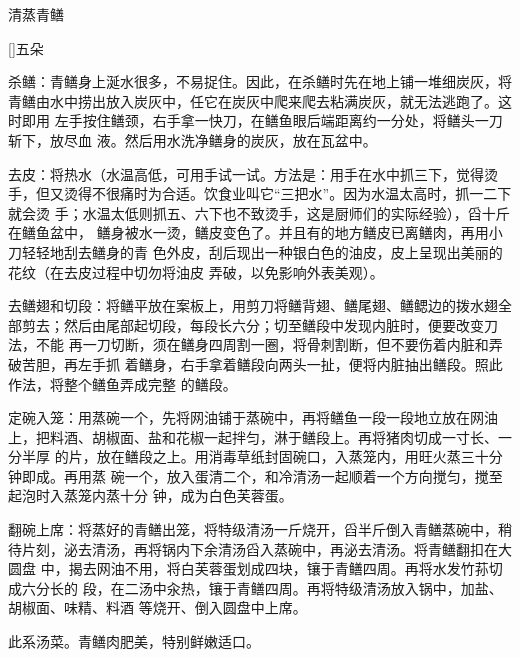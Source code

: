 \begin{recipe}{清蒸青鳝}

\ingredients

[\footnotemark]{五朵}

\preparation

\step 杀鳝：青鳝身上涎水很多，不易捉住。因此，在杀鳝时先在地上铺一堆细炭灰，将
青鳝由水中捞出放入炭灰中，任它在炭灰中爬来爬去粘满炭灰，就无法逃跑了。这时即用
左手按住鳝颈，右手拿一快刀，在鳝鱼眼后端距离约一分处，将鳝头一刀斩下，放尽血
液。然后用水洗净鳝身的炭灰，放在瓦盆中。

\step 去皮：将热水（水温高低，可用手试一试。方法是：用手在水中抓三下，觉得烫
手，但又烫得不很痛时为合适。饮食业叫它“三把水”。因为水温太高时，抓一二下就会烫
手；水温太低则抓五、六下也不致烫手，这是厨师们的实际经验），舀十斤在鳝鱼盆中，
鳝身被水一烫，鳝皮变色了。并且有的地方鳝皮已离鳝肉，再用小刀轻轻地刮去鳝身的青
色外皮，刮后现出一种银白色的油皮，皮上呈现出美丽的花纹（在去皮过程中切勿将油皮
弄破，以免影响外表美观）。

\step 去鳝翅和切段：将鳝平放在案板上，用剪刀将鳝背翅、鳝尾翅、鳝鳃边的拨水翅全
部剪去；然后由尾部起切段，每段长六分；切至鳝段中发现内脏时，便要改变刀法，不能
再一刀切断，须在鳝身四周割一圈，将骨刺割断，但不要伤着内脏和弄破苦胆，再左手抓
着鳝身，右手拿着鳝段向两头一扯，便将内脏抽出鳝段。照此作法，将整个鳝鱼弄成完整
的鳝段。

\step 定碗入笼：用蒸碗一个，先将网油铺于蒸碗中，再将鳝鱼一段一段地立放在网油
上，把料酒、胡椒面、盐和花椒一起拌匀，淋于鳝段上。再将猪肉切成一寸长、一分半厚
的片，放在鳝段之上。用消毒草纸封固碗口，入蒸笼内，用旺火蒸三十分钟即成。再用蒸
碗一个，放入蛋清二个，和冷清汤一起顺着一个方向搅匀，搅至起泡时入蒸笼内蒸十分
钟，成为白色芙蓉蛋。

\step 翻碗上席：将蒸好的青鳝出笼，将特级清汤一斤烧开，舀半斤倒入青鳝蒸碗中，稍
待片刻，泌去清汤，再将锅内下余清汤舀入蒸碗中，再泌去清汤。将青鳝翻扣在大圆盘
中，揭去网油不用，将白芙蓉蛋划成四块，镶于青鳝四周。再将水发竹荪切成六分长的
段，在二汤中汆热，镶于青鳝四周。再将特级清汤放入锅中，加盐、胡椒面、味精、料酒
等烧开、倒入圆盘中上席。

\features

此系汤菜。青鳝肉肥美，特别鲜嫩适口。


\end{recipe}

